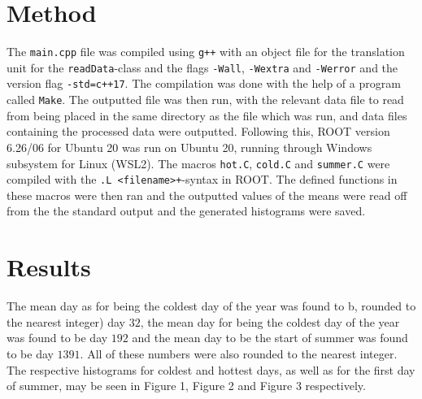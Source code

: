 \documentclass[a4, 12pt]{article}
\begin{document}
\section{Method}
The \texttt{main.cpp} file was compiled using \texttt{g++} with an object file for the translation unit for the \texttt{readData}-class and the flags \texttt{-Wall}, \texttt{-Wextra} and \texttt{-Werror} and the version flag \texttt{-std=c++17}. The compilation was done with the help of a program called \texttt{Make}. The outputted file was then run, with the relevant data file to read from being placed in the same directory as the file which was run, and data files containing the processed data were outputted. Following this, ROOT version 6.26/06 for Ubuntu 20 was run on Ubuntu 20, running through Windows subsystem for Linux (WSL2). The macros \texttt{hot.C}, \texttt{cold.C} and \texttt{summer.C} were compiled with the \texttt{.L <filename>+}-syntax in ROOT. The defined functions in these macros were then ran and the outputted values of the means were read off from the the standard output and the generated histograms were saved.



\section{Results}
The mean day as for being the coldest day of the year was found to b, rounded to the nearest integer) day $32$, the mean day for being the coldest day of the year was found to be day $192$ and the mean day to be the start of summer was found to be day $1391$. All of these numbers were also rounded to the nearest integer. The respective histograms for coldest and hottest days, as well as for the first day of summer, may be seen in Figure 1, Figure 2 and Figure 3 respectively.


\end{document}
